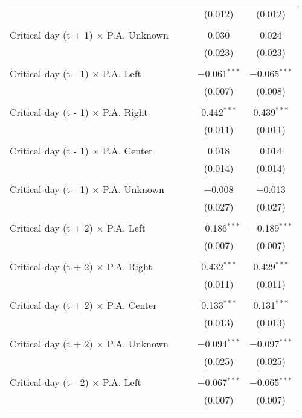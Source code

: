 \documentclass[
]{article}
\begin{document}
\begin{table}[!htbp]
{\begin{tabular}{@{\extracolsep{5pt}}lcccc}
  &  &  & (0.012) & (0.012) \\ 
  & & & & \\ 
 Critical day (t + 1) $\times$ P.A. Unknown &  &  & 0.030 & 0.024 \\ 
  &  &  & (0.023) & (0.023) \\ 
  & & & & \\ 
 Critical day (t - 1) $\times$ P.A. Left &  &  & $-$0.061$^{***}$ & $-$0.065$^{***}$ \\ 
  &  &  & (0.007) & (0.008) \\ 
  & & & & \\ 
 Critical day (t - 1) $\times$ P.A. Right &  &  & 0.442$^{***}$ & 0.439$^{***}$ \\ 
  &  &  & (0.011) & (0.011) \\ 
  & & & & \\ 
 Critical day (t - 1) $\times$ P.A. Center &  &  & 0.018 & 0.014 \\ 
  &  &  & (0.014) & (0.014) \\ 
  & & & & \\ 
 Critical day (t - 1) $\times$ P.A. Unknown &  &  & $-$0.008 & $-$0.013 \\ 
  &  &  & (0.027) & (0.027) \\ 
  & & & & \\ 
 Critical day (t + 2) $\times$ P.A. Left &  &  & $-$0.186$^{***}$ & $-$0.189$^{***}$ \\ 
  &  &  & (0.007) & (0.007) \\ 
  & & & & \\ 
 Critical day (t + 2) $\times$ P.A. Right &  &  & 0.432$^{***}$ & 0.429$^{***}$ \\ 
  &  &  & (0.011) & (0.011) \\ 
  & & & & \\ 
 Critical day (t + 2) $\times$ P.A. Center &  &  & 0.133$^{***}$ & 0.131$^{***}$ \\ 
  &  &  & (0.013) & (0.013) \\ 
  & & & & \\ 
 Critical day (t + 2) $\times$ P.A. Unknown &  &  & $-$0.094$^{***}$ & $-$0.097$^{***}$ \\ 
  &  &  & (0.025) & (0.025) \\ 
  & & & & \\ 
 Critical day (t - 2) $\times$ P.A. Left &  &  & $-$0.067$^{***}$ & $-$0.065$^{***}$ \\ 
  &  &  & (0.007) & (0.007) \\ 
  & & & & \\ 

\end{tabular}}
\end{table}
\end{document}
